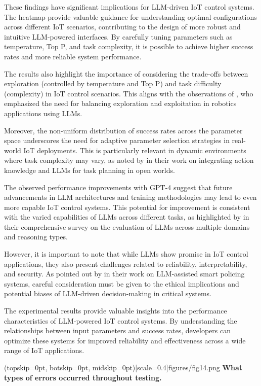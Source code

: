 \documentclass{ieeeaccess}
\begin{document}
These findings have significant implications for LLM-driven IoT control systems. The heatmap provide valuable guidance for understanding optimal configurations across different IoT scenarios, contributing to the design of more robust and intuitive LLM-powered interfaces. By carefully tuning parameters such as temperature, Top P, and task complexity, it is possible to achieve higher success rates and more reliable system performance.

The results also highlight the importance of considering the trade-offs between exploration (controlled by temperature and Top P) and task difficulty (complexity) in IoT control scenarios. This aligns with the observations of \citet{10500490}, who emphasized the need for balancing exploration and exploitation in robotics applications using LLMs.

Moreover, the non-uniform distribution of success rates across the parameter space underscores the need for adaptive parameter selection strategies in real-world IoT deployments. This is particularly relevant in dynamic environments where task complexity may vary, as noted by \citet{Ding2023} in their work on integrating action knowledge and LLMs for task planning in open worlds.

The observed performance improvements with GPT-4 suggest that future advancements in LLM architectures and training methodologies may lead to even more capable IoT control systems. This potential for improvement is consistent with the varied capabilities of LLMs across different tasks, as highlighted by \citet{10.1145/3641289} in their comprehensive survey on the evaluation of LLMs across multiple domains and reasoning types.

However, it is important to note that while LLMs show promise in IoT control applications, they also present challenges related to reliability, interpretability, and security. As pointed out by \citet{10538107} in their work on LLM-assisted smart policing systems, careful consideration must be given to the ethical implications and potential biases of LLM-driven decision-making in critical systems.

The experimental results provide valuable insights into the performance characteristics of LLM-powered IoT control systems. By understanding the relationships between input parameters and success rates, developers can optimize these systems for improved reliability and effectiveness across a wide range of IoT applications. 

\Figure[t!](topskip=0pt, botskip=0pt,
midskip=0pt)[scale=0.4]{{figures/fig14.png}}
{ \textbf{What types of errors occurred throughout testing.}\label{fig14}}
\end{document}
